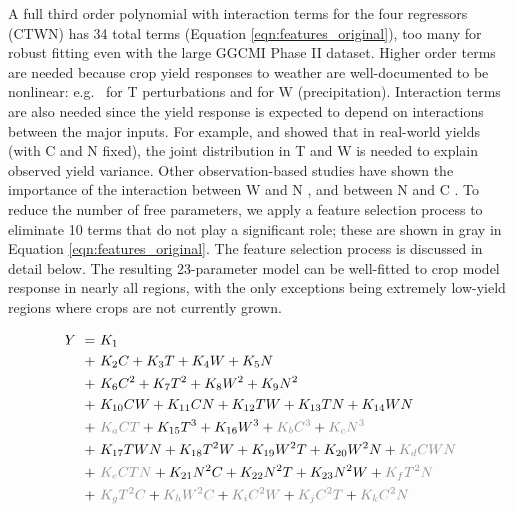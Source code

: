 \documentclass[gmd, manuscript]{copernicus} %
\begin{document}
A full third order polynomial with interaction terms for the four regressors (CTWN) has 34 total terms (Equation \ref{eqn:features_original}), too many for robust fitting even with the large GGCMI Phase II dataset. 
Higher order terms are needed because crop yield responses to weather are well-documented to be nonlinear: e.g.\ \citet{Schlenker2009} for T perturbations and \citet{He2016} for W (precipitation). 
Interaction terms are also needed since the yield response is expected to depend on interactions between the major inputs. 
For example, \citet{Lobell2007} and \citet{Tebaldi2008} showed that in real-world yields (with C and N fixed), the joint distribution in T and W is needed to explain observed yield variance.  
Other observation-based studies have shown the importance of the interaction between W and N \citep[e.g.][]{AULAKH2005}, and between N and C \citep{Mitsuru92, Nakamura97}. 
To reduce the number of free parameters, we apply a feature selection process to eliminate 10 terms that do not play a significant role; these are shown in {\color{dark-gray}gray} in Equation \ref{eqn:features_original}. 
The feature selection process is discussed in detail below. The resulting 23-parameter model can be well-fitted to crop model response in nearly all regions, with the only exceptions being extremely low-yield regions where crops are not currently grown.

\begin{align}
    \label{eqn:features_original}
    Y\ = \ & K_{1}  \\
    + \ & K_{2} C      + K_{3} T      + K_{4} W      + K_{5} N   \nonumber \\
    + \ & K_{6} C^2    + K_{7} T^2    + K_{8} W^2    + K_{9} N^2 \nonumber \\
    + \ & K_{10} C W   + K_{11} C N   + K_{12} T W   + K_{13} T N   + K_{14} W N \nonumber \\
    + \ & {\color{dark-gray}K_{a} C T} + K_{15} T^3   + K_{16} W^3   + {\color{dark-gray}K_{b} C^3} + {\color{dark-gray}K_{c} N^3} \nonumber \\
    + \ & K_{17} T W N + K_{18} T^2 W + K_{19} W^2 T + K_{20} W^2 N + {\color{dark-gray}K_{d} C W N} \nonumber \\
    + \ & {\color{dark-gray}K_{e} C T N} + K_{21} N^2 C + K_{22} N^2 T + K_{23} N^2 W + {\color{dark-gray}K_{f} T^2 N} \nonumber \\
    + \ & {\color{dark-gray}K_{g} T^2 C} + {\color{dark-gray}K_{h} W^2 C} + {\color{dark-gray}K_{i} C^2 W} + {\color{dark-gray}K_{j} C^2 T} + {\color{dark-gray}K_{k} C^2 N} \nonumber
\end{align}
\end{document}
